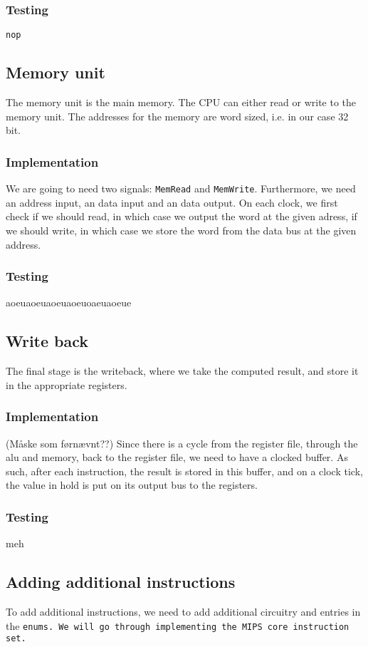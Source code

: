 \subsubsection*{Testing}
\texttt{nop}

\subsection{Memory unit}
The memory unit is the main memory. The CPU can either read or write to the
memory unit. The addresses for the memory are word sized, i.e. in our case 32
bit.

\subsubsection*{Implementation}
We are going to need two signals: \texttt{MemRead} and \texttt{MemWrite}.
Furthermore, we need an address input, an data input and an data output. On
each clock, we first check if we should read, in which case we output the word
at the given adress, if we should write, in which case we store the word from
the data bus at the given address.

\subsubsection*{Testing}
aoeuaoeuaoeuaoeuoaeuaoeue

\subsection{Write back}
The final stage is the writeback, where we take the computed result, and store
it in the appropriate registers.

\subsubsection*{Implementation}
(Måske som førnævnt??) Since there is a cycle from the register file, through
the alu and memory, back to the register file, we need to have a clocked
buffer. As such, after each instruction, the result is stored in this buffer,
and on a clock tick, the value in hold is put on its output bus to the
registers.

\subsubsection*{Testing}
meh

\subsection{Adding additional instructions}
To add additional instructions, we need to add additional circuitry and entries
in the \tt{enum}s. We will go through implementing the MIPS core instruction set.

